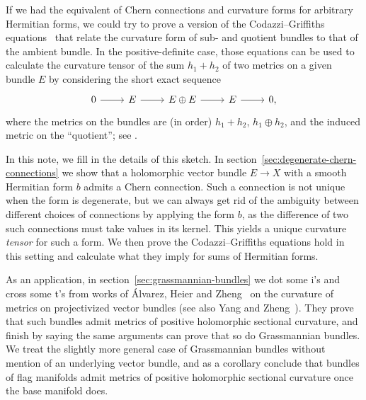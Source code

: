\documentclass[10pt,a4paper]{amsart}
\theoremstyle{definition}
\begin{document}
If we had the equivalent of Chern connections and curvature forms for arbitrary Hermitian forms, we could try to prove a version of the Codazzi--Griffiths equations~\cite{griffiths1965hermitian} that relate the curvature form of sub- and quotient bundles to that of the ambient bundle. In the positive-definite case, those equations can be used to calculate the curvature tensor of the sum $h_1 + h_2$ of two metrics on a given bundle $E$ by considering the short exact sequence
\[
\begin{tikzcd}
0 \ar[r] & E \ar[r] & E\oplus E \ar[r] &  E \ar[r] & 0,
\end{tikzcd}
\]
where the metrics on the bundles are (in order) $h_1 + h_2$, $h_1 \oplus h_2$, and the induced metric on the ``quotient''; see \cite[Chapter~7, Exercise~6]{zheng2000complex}.

In this note, we fill in the details of this sketch. In section~\ref{sec:degenerate-chern-connections} we show that a holomorphic vector bundle $E \to X$ with a smooth Hermitian form $b$ admits a Chern connection. Such a connection is not unique when the form is degenerate, but we can always get rid of the ambiguity between different choices of connections by applying the form $b$, as the difference of two such connections must take values in its kernel. This yields a unique curvature \emph{tensor} for such a form. We then prove the Codazzi--Griffiths equations hold in this setting and calculate what they imply for sums of Hermitian forms.

As an application, in section~\ref{sec:grassmannian-bundles} we dot some i's and cross some t's from works of \'Alvarez, Heier and Zheng~\cite{alvarez2016positive,alvarez2018projectivized} on the curvature of metrics on projectivized vector bundles (see also Yang and Zheng~\cite{yang2019hirzebruch}). They prove that such bundles admit metrics of positive holomorphic sectional curvature, and finish by saying the same arguments can prove that so do Grassmannian bundles. We treat the slightly more general case of Grassmannian bundles without mention of an underlying vector bundle, and as a corollary conclude that bundles of flag manifolds admit metrics of positive holomorphic sectional curvature once the base manifold does.

\end{document}
